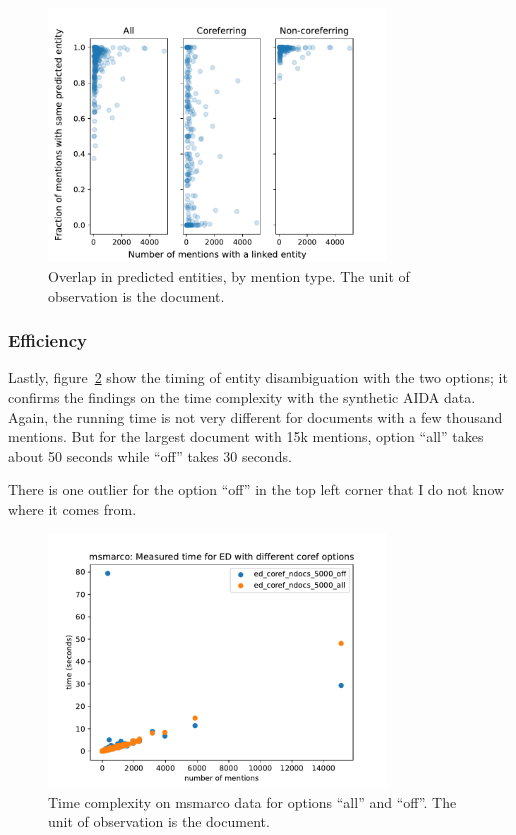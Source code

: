 \documentclass[a4paper,11pt]{article}
\numberwithin{equation}{section} %
\begin{document}
\begin{figure}[H]
  \centering
  \includegraphics[width = 0.8\textwidth]{../figs/msmarco_overlap.pdf}
  \caption{Overlap in predicted entities, by mention type. The unit of observation is the document.}
  \label{fig:msmarco_overlap}
\end{figure}

\subsubsection{Efficiency}

Lastly, figure~\ref{fig:timing_msmarco} show the timing of entity disambiguation with the two options; it confirms the findings on the time complexity with the synthetic AIDA data. Again, the running time is not very different for documents with a few thousand mentions. But for the largest document with 15k mentions, option ``all'' takes about 50 seconds while ``off'' takes 30 seconds.

There is one outlier for the option ``off'' in the top left corner that I do not know where it comes from. 

\begin{figure}[H]
  \centering
  \includegraphics[width = 0.8\textwidth]{../figs/timing_msmarco.pdf}
  \caption{Time complexity on msmarco data for options ``all'' and ``off''. The unit of observation is the document.}
  \label{fig:timing_msmarco}
\end{figure}
\end{document}
